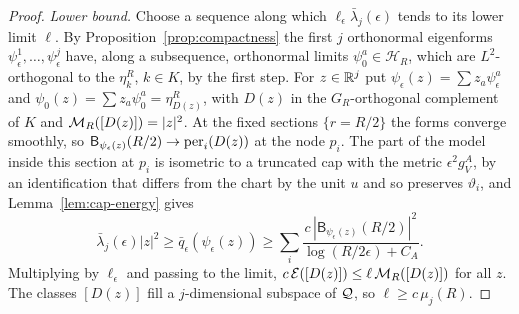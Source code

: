 \begin{proof}
\emph{Lower bound.} Choose a sequence along which
$\ell_\epsilon\bar\lambda_j(\epsilon)$ tends to its lower limit $\ell$.
By Proposition~\ref{prop:compactness} the first $j$ orthonormal
eigenforms $\psi^1_\epsilon,\ldots,\psi^j_\epsilon$ have, along a
subsequence, orthonormal limits $\psi^a_0\in\mathcal H_R$, which are
$L^2$-orthogonal to the $\eta^R_k$, $k\in K$, by the first step. For
$z\in\mathbb R^j$ put $\psi_\epsilon(z)=\sum z_a\psi^a_\epsilon$ and
$\psi_0(z)=\sum z_a\psi^a_0=\eta^R_{D(z)}$, with $D(z)$ in the
$G_R$-orthogonal complement of $K$ and $\mathcal M_R([D(z)])=|z|^2$. At the
fixed sections $\{r=R/2\}$ the forms converge smoothly, so
$\mathsf B_{\psi_\epsilon(z)}(R/2)\to \operatorname{per}_i(D(z))$ at the node $p_i$. The
part of the model inside this section at $p_i$ is isometric to a
truncated cap with the metric $\epsilon^2g^A_V$, by an identification
that differs from the chart by the unit $u$ and so preserves
$\vartheta_i$, and
Lemma~\ref{lem:cap-energy} gives
\[
 \bar\lambda_j(\epsilon)|z|^2\ge\bar q_\epsilon(\psi_\epsilon(z))\ge
 \sum_i\frac{c\,|\mathsf B_{\psi_\epsilon(z)}(R/2)|^2}
 {\log(R/2\epsilon)+C_A}.
\]
Multiplying by $\ell_\epsilon$ and passing to the limit,
$c\,\mathcal E([D(z)])\le\ell\,\mathcal M_R([D(z)])$ for all $z$. The classes $[D(z)]$
fill a $j$-dimensional subspace of $\mathcal Q$, so $\ell\ge c\,\mu_j(R)$.
\end{proof}
